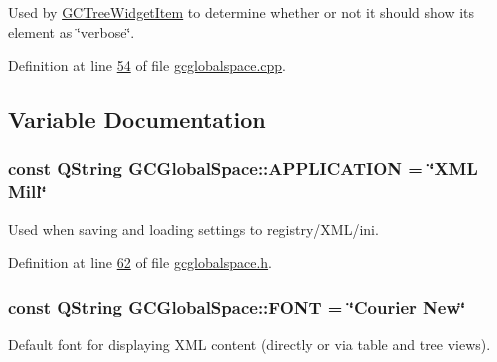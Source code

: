 \-Used by \hyperlink{class_g_c_tree_widget_item}{\-G\-C\-Tree\-Widget\-Item} to determine whether or not it should show its element as \char`\"{}verbose\char`\"{}. 



\-Definition at line \hyperlink{gcglobalspace_8cpp_source_l00054}{54} of file \hyperlink{gcglobalspace_8cpp_source}{gcglobalspace.\-cpp}.



\subsection{\-Variable \-Documentation}
\hypertarget{namespace_g_c_global_space_ab53b9c3447f00f1cc45a1d3fdfbba564}{
\subsubsection[{\-A\-P\-P\-L\-I\-C\-A\-T\-I\-O\-N}]{\setlength{\rightskip}{0pt plus 5cm}const \-Q\-String {\bf \-G\-C\-Global\-Space\-::\-A\-P\-P\-L\-I\-C\-A\-T\-I\-O\-N} = \char`\"{}\-X\-M\-L \-Mill\char`\"{}}}\label{namespace_g_c_global_space_ab53b9c3447f00f1cc45a1d3fdfbba564}


\-Used when saving and loading settings to registry/\-X\-M\-L/ini. 



\-Definition at line \hyperlink{gcglobalspace_8h_source_l00062}{62} of file \hyperlink{gcglobalspace_8h_source}{gcglobalspace.\-h}.

\hypertarget{namespace_g_c_global_space_a9d7158c8a1dfcc867d85ee6b9c5c4810}{
\subsubsection[{\-F\-O\-N\-T}]{\setlength{\rightskip}{0pt plus 5cm}const \-Q\-String {\bf \-G\-C\-Global\-Space\-::\-F\-O\-N\-T} = \char`\"{}\-Courier \-New\char`\"{}}}\label{namespace_g_c_global_space_a9d7158c8a1dfcc867d85ee6b9c5c4810}


\-Default font for displaying \-X\-M\-L content (directly or via table and tree views). 



